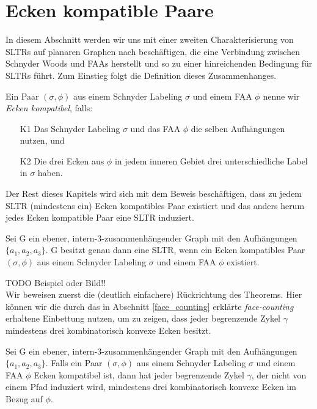\section{Ecken kompatible Paare}

In diesem Abschnitt werden wir uns mit einer zweiten Charakterisierung von SLTRs auf planaren Graphen nach \cite{af15} beschäftigen, die eine Verbindung zwischen Schnyder Woods und FAAs herstellt und so zu einer hinreichenden Bedingung für SLTRs führt. Zum Einstieg folgt die Definition dieses Zusammenhanges.

\begin{definition}\label{def_ccc}
Ein Paar $(\sigma,\phi)$ aus einem Schnyder Labeling $\sigma$ und einem FAA $\phi$ nenne wir \textit{Ecken kompatibel}, falls:
\begin{itemize}
\item [K1] Das Schnyder Labeling $\sigma$ und das FAA $\phi$ die selben Aufhängungen nutzen, und
\item [K2] Die drei Ecken aus $\phi$ in jedem inneren Gebiet drei unterschiedliche Label in $\sigma$ haben.
\end{itemize}
\end{definition}

Der Rest dieses Kapitels wird sich mit dem Beweis beschäftigen, dass zu jedem SLTR (mindestens ein) Ecken kompatibles Paar existiert und das anders herum jedes Ecken kompatible Paar eine SLTR induziert.

\begin{theorem}\label{theo_ccc}
Sei G ein ebener, intern-3-zusammenhängender Graph mit den Aufhängungen $\{a_1,a_2,a_3\}$. G besitzt genau dann eine SLTR, wenn ein Ecken kompatibles Paar $(\sigma,\phi)$ aus einem Schnyder Labeling $\sigma$ und einem FAA $\phi$ existiert.
\end{theorem}

TODO Beispiel oder Bild!! \\

Wir beweisen zuerst die (deutlich einfachere) Rückrichtung des Theorems. Hier können wir die durch das in Abschnitt \ref{face_counting} erklärte \textit{face-counting} erhaltene Einbettung nutzen, um zu zeigen, dass jeder begrenzende Zykel $\gamma$ mindestens drei kombinatorisch konvexe Ecken besitzt. 

\begin{lemma}\label{lem1}
Sei G ein ebener, intern-3-zusammenhängender Graph mit den Aufhängungen $\{a_1,a_2,a_3\}$. Falls ein Paar $(\sigma,\phi)$ aus einem Schnyder Labeling $\sigma$ und einem FAA $\phi$ Ecken kompatibel ist, dann hat jeder begrenzende Zykel $\gamma$, der nicht von einem Pfad induziert wird, mindestens drei kombinatorisch konvexe Ecken im Bezug auf $\phi$.
\end{lemma}

